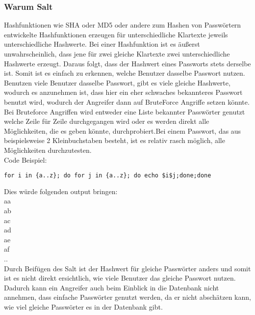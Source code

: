 {\subsubsection{Warum Salt}
Hashfunktionen wie SHA oder MD5 oder andere zum Hashen von Passwörtern entwickelte Hashfunktionen erzeugen für unterschiedliche Klartexte jeweils unterschiedliche Hashwerte. Bei einer Hashfunktion ist es äußerst unwahrscheinlich, dass jene für zwei gleiche Klartexte zwei unterschiedliche Hashwerte erzeugt. Daraus folgt, dass der Hashwert eines Passworts stets derselbe ist. Somit ist es einfach zu erkennen, welche Benutzer dasselbe Passwort nutzen. Benutzen viele Benutzer dasselbe Passwort, gibt es viele gleiche Hashwerte, wodurch es anzunehmen ist, dass hier ein eher schwaches bekannteres Passwort benutzt wird, wodurch der Angreifer dann auf BruteForce Angriffe setzen könnte. Bei Bruteforce Angriffen wird entweder eine Liste bekannter Passwörter genutzt welche Zeile für Zeile durchgegangen wird oder es werden direkt alle Möglichkeiten, die es geben könnte, durchprobiert.Bei einem Passwort, das aus beispielsweise 2 Kleinbuchstaben besteht, ist es relativ rasch möglich, alle Möglichkeiten durchzutesten.\\ Code Beispiel:
\begin{lstlisting} 
for i in {a..z}; do for j in {a..z}; do echo $i$j;done;done 
\end{lstlisting}
Dies würde folgenden output bringen: \\
aa\\
ab\\
ac\\
ad\\
ae\\
af\\
..\\
Durch Beifügen des Salt ist der Hashwert für gleiche Passwörter anders und somit ist es nicht direkt ersichtlich, wie viele Benutzer das gleiche Passwort nutzen. Dadurch kann ein Angreifer auch beim Einblick in die Datenbank nicht annehmen, dass einfache Passwörter genutzt werden, da er nicht abschätzen kann, wie viel gleiche Passwörter es in der Datenbank gibt.
}

